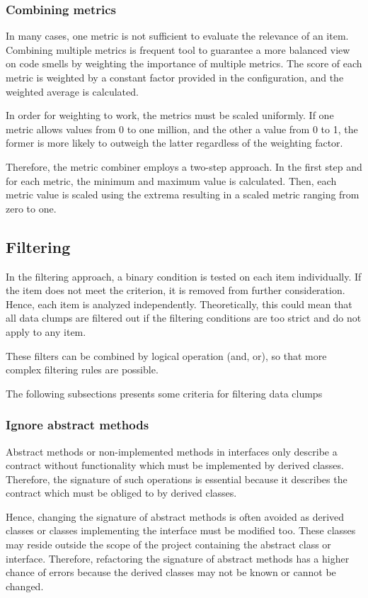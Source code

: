\subsubsection{Combining metrics}

In many cases, one metric is not sufficient to evaluate the relevance of an item. Combining multiple metrics is frequent tool to guarantee a more balanced view on code smells by weighting the importance of multiple metrics. The score of each metric is weighted by a constant factor provided in the configuration, and the weighted average is calculated. 

 In order for weighting to work, the metrics must be scaled uniformly. If one metric allows values from 0 to one million, and the other a value from 0 to 1, the former is more likely to outweigh the latter regardless of the weighting factor. 
 
 Therefore, the metric combiner employs a two-step approach. In the first step and for each metric, the minimum and maximum value is calculated. Then, each metric value is scaled using the extrema resulting in a scaled metric ranging from zero to one.  

\subsection{Filtering}
In the filtering approach, a binary condition is tested on each item individually. If the item does not meet the criterion, it is removed from further consideration. Hence, each item is analyzed independently. Theoretically, this could mean that all data clumps are filtered out if the filtering conditions are too strict and do not apply to any item. 

These filters can be combined by logical operation (and, or), so that more complex filtering rules are possible. 

The following subsections presents some  criteria for filtering data clumps
\subsubsection{Ignore abstract methods}

Abstract methods or non-implemented methods in interfaces only describe a contract without functionality which must be implemented by derived classes. Therefore, the signature of such operations is essential because it describes the contract which must be obliged to by derived classes.

Hence, changing the signature of abstract methods is often avoided as derived classes or classes implementing the interface must be modified too. These classes may reside outside the scope of the project containing the abstract class or interface. Therefore, refactoring the signature of abstract methods has a higher chance of errors because the derived classes may not be known or cannot be changed. 

